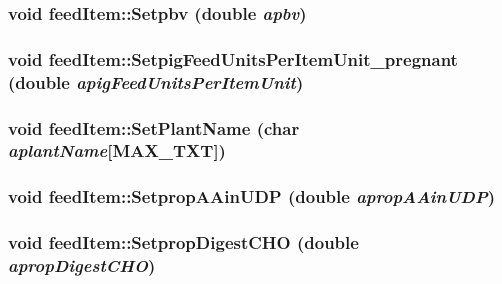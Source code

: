 \label{classfeed_item_a8f08fb0fa5aa998baec8cc09dda96f3e}
\hypertarget{classfeed_item_a8bec4685c5f70384fc3801c6c77dfc5a}{
\subsubsection[{Setpbv}]{\setlength{\rightskip}{0pt plus 5cm}void feedItem::Setpbv (double {\em apbv})}}
\label{classfeed_item_a8bec4685c5f70384fc3801c6c77dfc5a}
\hypertarget{classfeed_item_ab1d2af37391e40833af70b55b1ca6daf}{
\subsubsection[{SetpigFeedUnitsPerItemUnit\_\-pregnant}]{\setlength{\rightskip}{0pt plus 5cm}void feedItem::SetpigFeedUnitsPerItemUnit\_\-pregnant (double {\em apigFeedUnitsPerItemUnit})}}
\label{classfeed_item_ab1d2af37391e40833af70b55b1ca6daf}
\hypertarget{classfeed_item_a09e4df6c141127dba83ca18d0878e0d3}{
\subsubsection[{SetPlantName}]{\setlength{\rightskip}{0pt plus 5cm}void feedItem::SetPlantName (char {\em aplantName}\mbox{[}MAX\_\-TXT\mbox{]})}}
\label{classfeed_item_a09e4df6c141127dba83ca18d0878e0d3}
\hypertarget{classfeed_item_a5cf127a6895d93e2a0ad370211693762}{
\subsubsection[{SetpropAAinUDP}]{\setlength{\rightskip}{0pt plus 5cm}void feedItem::SetpropAAinUDP (double {\em apropAAinUDP})}}
\label{classfeed_item_a5cf127a6895d93e2a0ad370211693762}
\hypertarget{classfeed_item_a402e160cb67531d01d55621e7fab8c9b}{
\subsubsection[{SetpropDigestCHO}]{\setlength{\rightskip}{0pt plus 5cm}void feedItem::SetpropDigestCHO (double {\em apropDigestCHO})}}
